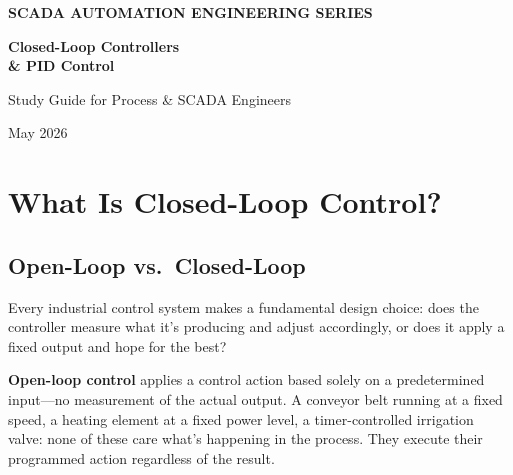 \documentclass[12pt,twoside,openright]{memoir}
\begin{document}
\begin{titlingpage}

\vspace*{0.5in}
{\color{white}\fontsize{11}{13}\sffamily\bfseries SCADA AUTOMATION ENGINEERING SERIES}
\vspace{0.15in}

{\color{pidcyan}\fontsize{40}{44}\bfseries\sffamily Closed-Loop Controllers}\\[6pt]
{\color{white}\fontsize{40}{44}\bfseries\sffamily \& PID Control}
\vspace{0.1in}

{\color{white!70}\fontsize{14}{18}\sffamily Study Guide for Process \& SCADA Engineers}

\vspace{1.9in}
\begin{flushleft}
{\sffamily\color{gray} May 2026}
\end{flushleft}
\vfill
\end{titlingpage}

\frontmatter
\tableofcontents
\mainmatter

\chapter{What Is Closed-Loop Control?}

\section{Open-Loop vs.\ Closed-Loop}

Every industrial control system makes a fundamental design choice: does the controller measure what it's producing and adjust accordingly, or does it apply a fixed output and hope for the best?

\textbf{Open-loop control} applies a control action based solely on a predetermined input---no measurement of the actual output. A conveyor belt running at a fixed speed, a heating element at a fixed power level, a timer-controlled irrigation valve: none of these care what's happening in the process. They execute their programmed action regardless of the result.
\end{document}
